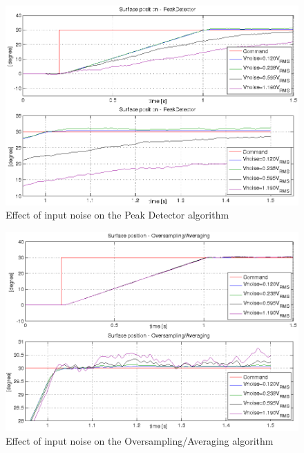 \documentclass[conference]{IEEEtran}
\begin{document}
\begin{figure}[h!]
\centering
\includegraphics[scale=0.32]{pics/results/noisetol_peakdetector.png}
\caption{Effect of input noise on the Peak Detector algorithm}
\label{fig:noisetol_peakdetector}
\end{figure}

\begin{figure}[h!]
\centering
\includegraphics[scale=0.32]{pics/results/noisetol_oversampling.png}
\caption{Effect of input noise on the Oversampling/Averaging algorithm}
\label{fig:noisetol_oversampling}
\end{figure}
\end{document}
